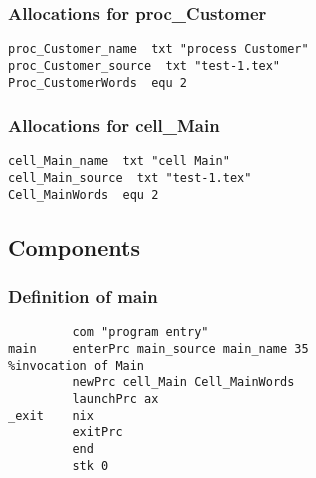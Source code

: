 \subsubsection{Allocations for proc\_Customer}
\begin{verbatim}
proc_Customer_name  txt "process Customer"
proc_Customer_source  txt "test-1.tex"
Proc_CustomerWords  equ 2
\end{verbatim}

\subsubsection{Allocations for cell\_Main}
\begin{verbatim}
cell_Main_name  txt "cell Main"
cell_Main_source  txt "test-1.tex"
Cell_MainWords  equ 2
\end{verbatim}

\subsection{Components}

\subsubsection{Definition of main}
\begin{verbatim}
         com "program entry"
main     enterPrc main_source main_name 35
%invocation of Main
         newPrc cell_Main Cell_MainWords
         launchPrc ax
_exit    nix
         exitPrc
         end
         stk 0
\end{verbatim}

